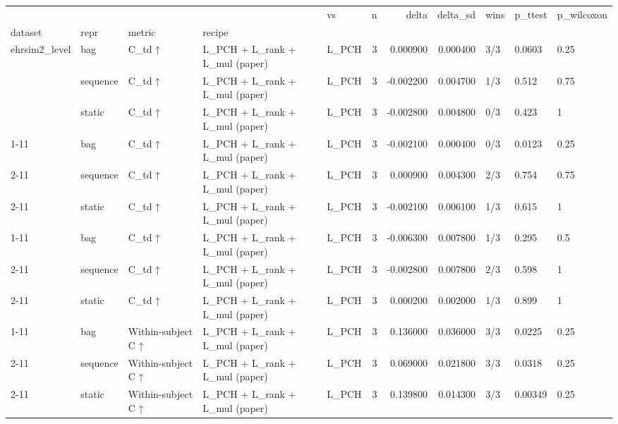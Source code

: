 \begin{tabular}{lllllrrrlll}
\toprule
 &  &  &  & vs & n & delta & delta\_sd & wins & p\_ttest & p\_wilcoxon \\
dataset & repr & metric & recipe &  &  &  &  &  &  &  \\
\midrule
\multirow[t]{3}{*}{ehrsim2\_level} & bag & C\_td ↑ & L\_PCH + L\_rank + L\_mul (paper) & L\_PCH & 3 & 0.000900 & 0.000400 & 3/3 & 0.0603 & 0.25 \\
\cline{2-11} \cline{3-11}
 & sequence & C\_td ↑ & L\_PCH + L\_rank + L\_mul (paper) & L\_PCH & 3 & -0.002200 & 0.004700 & 1/3 & 0.512 & 0.75 \\
\cline{2-11} \cline{3-11}
 & static & C\_td ↑ & L\_PCH + L\_rank + L\_mul (paper) & L\_PCH & 3 & -0.002800 & 0.004800 & 0/3 & 0.423 & 1 \\
\cline{1-11} \cline{2-11} \cline{3-11}
\multirow[t]{3}{*}{ehrsim2\_mixed} & bag & C\_td ↑ & L\_PCH + L\_rank + L\_mul (paper) & L\_PCH & 3 & -0.002100 & 0.000400 & 0/3 & 0.0123 & 0.25 \\
\cline{2-11} \cline{3-11}
 & sequence & C\_td ↑ & L\_PCH + L\_rank + L\_mul (paper) & L\_PCH & 3 & 0.000900 & 0.004300 & 2/3 & 0.754 & 0.75 \\
\cline{2-11} \cline{3-11}
 & static & C\_td ↑ & L\_PCH + L\_rank + L\_mul (paper) & L\_PCH & 3 & -0.002100 & 0.006100 & 1/3 & 0.615 & 1 \\
\cline{1-11} \cline{2-11} \cline{3-11}
\multirow[t]{3}{*}{ehrsim2\_order} & bag & C\_td ↑ & L\_PCH + L\_rank + L\_mul (paper) & L\_PCH & 3 & -0.006300 & 0.007800 & 1/3 & 0.295 & 0.5 \\
\cline{2-11} \cline{3-11}
 & sequence & C\_td ↑ & L\_PCH + L\_rank + L\_mul (paper) & L\_PCH & 3 & -0.002800 & 0.007800 & 2/3 & 0.598 & 1 \\
\cline{2-11} \cline{3-11}
 & static & C\_td ↑ & L\_PCH + L\_rank + L\_mul (paper) & L\_PCH & 3 & 0.000200 & 0.002000 & 1/3 & 0.899 & 1 \\
\cline{1-11} \cline{2-11} \cline{3-11}
\multirow[t]{3}{*}{ehrsim2\_level} & bag & Within-subject C ↑ & L\_PCH + L\_rank + L\_mul (paper) & L\_PCH & 3 & 0.136000 & 0.036000 & 3/3 & 0.0225 & 0.25 \\
\cline{2-11} \cline{3-11}
 & sequence & Within-subject C ↑ & L\_PCH + L\_rank + L\_mul (paper) & L\_PCH & 3 & 0.069000 & 0.021800 & 3/3 & 0.0318 & 0.25 \\
\cline{2-11} \cline{3-11}
 & static & Within-subject C ↑ & L\_PCH + L\_rank + L\_mul (paper) & L\_PCH & 3 & 0.139800 & 0.014300 & 3/3 & 0.00349 & 0.25 \\

\end{tabular}
